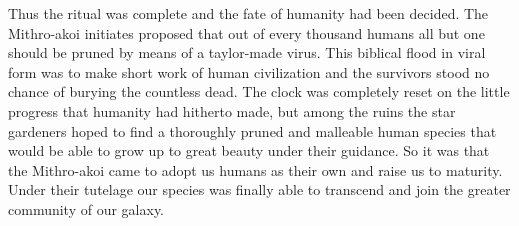 \documentclass[14pt]{extarticle}
\begin{document}
Thus the ritual was complete and the fate of humanity had been decided.
The Mithro-akoi initiates proposed that out of every thousand humans all but one should be pruned by means of a taylor-made virus.
This biblical flood in viral form was to make short work of human civilization 
and the survivors stood no chance of burying the countless dead. 
The clock was completely reset on the little progress that humanity had hitherto made,
but among the ruins the star gardeners hoped to find a thoroughly pruned and malleable human species that would be able to grow up to great beauty under their guidance.
So it was that the Mithro-akoi came to adopt us humans as their own and raise us to maturity.
Under their tutelage our species was finally able to transcend and join the greater community of our galaxy.
\end{document}
